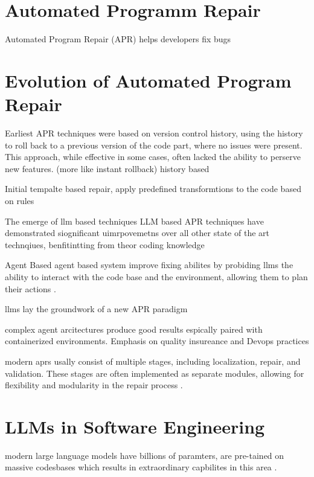 \section{Automated Programm Repair}

Automated Program Repair (APR) helps developers fix bugs


\section{Evolution of Automated Program Repair}
Earliest APR techniques were based on version control history, using the history to roll back to a previous version of the code part, where no issues were present. This approach, while effective in some cases, often lacked the ability to perserve new features. (more like instant rollback)
history based

Initial tempalte based repair,
apply predefined transformtions to the code based on rules

The emerge of llm based techniques
LLM based APR techniques have demonstrated siognificant uimrpovemetns over all other state of the art technqiues, benfitintting from theor coding knowledge \cite{hossainDeepDiveLarge2024}

Agent Based
agent based system improve fixing abilites by probiding llms the ability to interact with the code base and the environment, allowing them to plan their actions  \cite{yangSWEagentAgentComputerInterfaces2024}.

llms lay the groundwork of a new APR paradigm \cite{chenUnveilingPitfallsUnderstanding2025}

complex agent arcitectures produce good results espically paired with containerized environments. Emphasis on quality insureance and Devops practices \cite{puvvadiCodingAgentsComprehensive2025}


modern aprs usally consist of multiple stages, including localization, repair, and validation. These stages are often implemented as separate modules, allowing for flexibility and modularity in the repair process \cite{yangSWEagentAgentComputerInterfaces2024}.

\section{LLMs in Software Engineering}

modern large language models have billions of paramters, are pre-tained on massive codesbases which results in extraordinary capbilites in this area  \cite{chenUnveilingPitfallsUnderstanding2025}.

